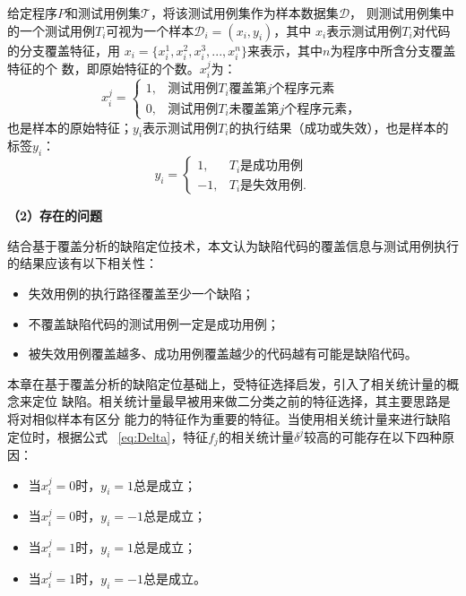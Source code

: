 给定程序$P$和测试用例集$\mathcal T$，将该测试用例集作为样本数据集$\mathcal D$，
则测试用例集中的一个测试用例$T_i$可视为一个样本$\mathcal D_i=(x_i,y_i)$，其中
$x_i$表示测试用例$T_i$对代码的分支覆盖特征，用
$x_i=\{x_i^1,x_i^2,x_i^3,...,x_i^n\}$来表示，其中$n$为程序中所含分支覆盖特征的个
数，即原始特征的个数。$x_i^j$为：
\begin{equation}\label{eq:cov}
      x_i^j = 
       \begin{cases}
             1, & \mbox{测试用例}T_i\mbox{覆盖第}j\mbox{个程序元素}\\ 
  0, & \mbox{测试用例}T_i\mbox{未覆盖第}j\mbox{个程序元素}，  
       \end{cases}
\end{equation}
也是样本的原始特征；$y_i$表示测试用例$T_i$的执行结果（成功或失效），也是样本的标签$y_i$：
\begin{equation}
      y_i = 
       \begin{cases}
             1, & T_i\mbox{是成功用例}\\ 
  -1, & T_i\mbox{是失效用例}.  
       \end{cases}
\end{equation}

\textbf{（2）存在的问题}

结合基于覆盖分析的缺陷定位技术，本文认为缺陷代码的覆盖信息与测试用例执行的结果应该有以下相关性：
\begin{itemize}
      \item 失效用例的执行路径覆盖至少一个缺陷；
      \item 不覆盖缺陷代码的测试用例一定是成功用例；
      \item 被失效用例覆盖越多、成功用例覆盖越少的代码越有可能是缺陷代码。
\end{itemize}

本章在基于覆盖分析的缺陷定位基础上，受特征选择启发，引入了相关统计量的概念来定位
缺陷。相关统计量最早被用来做二分类之前的特征选择，其主要思路是将对相似样本有区分
能力的特征作为重要的特征。当使用相关统计量来进行缺陷定位时，根据公式
~\ref{eq:Delta}，特征$f_j$的相关统计量$\delta^j$较高的可能存在以下四种原因：
\begin{itemize}
      \item 当$x_i^j=0$时，$y_i=1$总是成立；
      \item 当$x_i^j=0$时，$y_i=-1$总是成立；
      \item 当$x_i^j=1$时，$y_i=1$总是成立；
      \item 当$x_i^j=1$时，$y_i=-1$总是成立。
\end{itemize}

